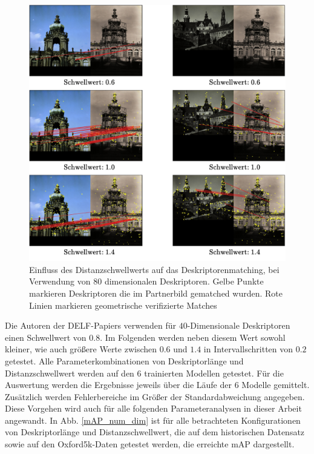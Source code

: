 \begin{figure}[H]
\centering
\includegraphics[scale=0.86]{influence_threshold}
\caption{Einfluss des Distanzschwellwerts auf das Deskriptorenmatching, bei Verwendung von $80$ dimensionalen Deskriptoren. Gelbe Punkte markieren Deskriptoren die im Partnerbild gematched wurden. Rote Linien markieren geometrische verifizierte Matches}
\label{influence_threshold}
\end{figure}

Die Autoren der DELF-Papiers \cite{delf} verwenden für $40$-Dimensionale Deskriptoren einen Schwellwert von $0.8$. 
Im Folgenden werden neben diesem Wert sowohl kleiner, wie auch größere Werte zwischen $0.6$ und $1.4$ in Intervallschritten von $0.2$ getestet. Alle Parameterkombinationen von Deskriptorlänge und Distanzschwellwert werden auf den $6$ trainierten Modellen getestet. Für die Auswertung werden die Ergebnisse jeweils über die Läufe der $6$ Modelle gemittelt. Zusätzlich werden Fehlerbereiche im Größer der Standardabweichung angegeben. Diese Vorgehen wird auch für alle folgenden Parameteranalysen in dieser Arbeit angewandt. In Abb. \ref{mAP_num_dim} ist für alle betrachteten Konfigurationen von Deskriptorlänge und Distanzschwellwert, die auf dem historischen Datensatz sowie auf den Oxford5k-Daten getestet werden, die erreichte mAP dargestellt.

